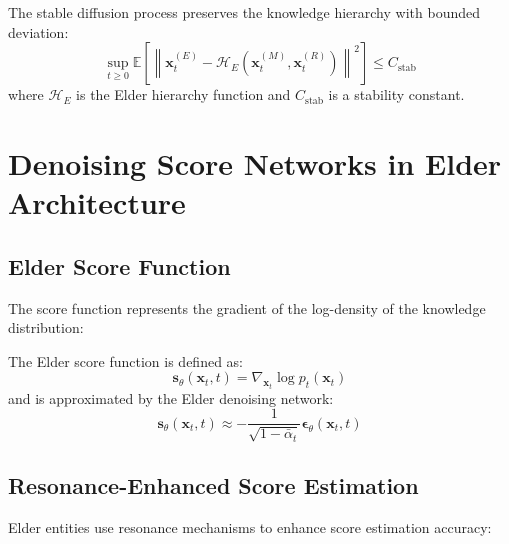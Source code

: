 \begin{corollary}
The stable diffusion process preserves the knowledge hierarchy with bounded deviation:
\begin{equation}
\sup_{t \geq 0} \mathbb{E}\left[\left\|\mathbf{x}_t^{(E)} - \mathcal{H}_E(\mathbf{x}_t^{(M)}, \mathbf{x}_t^{(R)})\right\|^2\right] \leq C_{\text{stab}}
\end{equation}
where $\mathcal{H}_E$ is the Elder hierarchy function and $C_{\text{stab}}$ is a stability constant.
\end{corollary}

\section{Denoising Score Networks in Elder Architecture}

\subsection{Elder Score Function}

The score function represents the gradient of the log-density of the knowledge distribution:

\begin{definition}
The Elder score function is defined as:
\begin{equation}
\mathbf{s}_\theta(\mathbf{x}_t, t) = \nabla_{\mathbf{x}_t} \log p_t(\mathbf{x}_t)
\end{equation}
and is approximated by the Elder denoising network:
\begin{equation}
\mathbf{s}_\theta(\mathbf{x}_t, t) \approx -\frac{1}{\sqrt{1-\bar{\alpha}_t}} \boldsymbol{\epsilon}_\theta(\mathbf{x}_t, t)
\end{equation}
\end{definition}

\subsection{Resonance-Enhanced Score Estimation}

Elder entities use resonance mechanisms to enhance score estimation accuracy:

